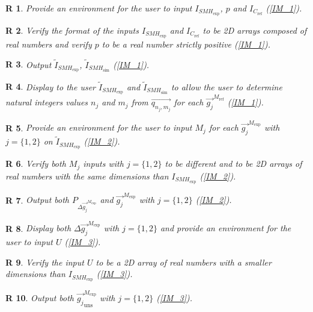 \documentclass[12pt]{article}
\newtheorem{R}{R}
\begin{document}
\begin{R}
\label{R_1}
\normalfont Provide an environment for the user to input $I_{\mathit{SMH}_{\text{exp}}}$, $p$ and $I_{C_{\text{ref}}}$ (\cref{IM_1}).
\end{R}
\begin{R}
\label{R_2}
\normalfont Verify the format of the inputs $I_{\mathit{SMH}_{\text{exp}}}$ and $I_{C_{\text{ref}}}$ to be 2D arrays composed of real numbers and verify $p$ to be a real number strictly positive (\cref{IM_1}).
\end{R}
\begin{R}
\label{R_3}
\normalfont Output $\widetilde{I}_{\mathit{SMH}_{\text{exp}}}$, $\widetilde{I}_{\mathit{SMH}_{\text{sim}}}$ (\cref{IM_1}).
\end{R}
\begin{R}
\label{R_4}
\normalfont Display to the user $\widetilde{I}_{\mathit{SMH}_{\text{exp}}}$ and $\widetilde{I}_{\mathit{SMH}_{\text{sim}}}$ to allow the user to determine natural integers values $n_j$ and $m_j$ from $\overrightarrow{q_{n_j,m_j}}$ for each $\overrightarrow{g_j}^{M_{\text{ref}}}$ (\cref{IM_1}).
\end{R}
\begin{R}
\label{R_5}
\normalfont Provide an environment for the user to input $M_j$ for each $\overrightarrow{g_{j}}^{M_{\text{exp}}}$ with $j=\{1,2\}$ on $\widetilde{I}_{\mathit{SMH}_{\text{exp}}}$ (\cref{IM_2}).
\end{R}
\begin{R}
\label{R_6}
\normalfont Verify both $M_j$ inputs with $j=\{1,2\}$ to be different and to be 2D arrays of real numbers with the same dimensions than $I_{\mathit{SMH}_{\text{exp}}}$ (\cref{IM_2}).
\end{R}
\begin{R}
\label{R_7}
\normalfont Output both $P_{\Delta \overrightarrow{g_{j}}^{M_{\text{exp}}}}$ and $\overrightarrow{g_{j}}^{M_{\text{exp}}}$ with $j=\{1,2\}$ (\cref{IM_2}).
\end{R}
\begin{R}
\label{R_8}
\normalfont Display both $\Delta \overrightarrow{g_{j}}^{M_{\text{exp}}}$  with $j=\{1,2\}$ and provide an environment for the user to input $U$ (\cref{IM_3}).
\end{R}
\begin{R}
\label{R_9}
\normalfont Verify the input $U$ to be a 2D array of real numbers with a smaller dimensions than $I_{\mathit{SMH}_{\text{exp}}}$ (\cref{IM_3}).
\end{R}
\begin{R}
\label{R_10}
\normalfont Output both $\overrightarrow{g_{j}}_{\text{uns}}^{M_{\text{exp}}}$ with $j=\{1,2\}$ (\cref{IM_3}).
\end{R}
\end{document}
